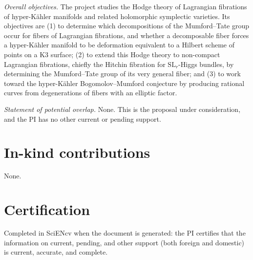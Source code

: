 \documentclass[11pt]{article}
\begin{document}
\emph{Overall objectives.} The project studies the Hodge theory of Lagrangian fibrations of
hyper-K\"ahler manifolds and related holomorphic symplectic varieties. Its objectives are
(1) to determine which decompositions of the Mumford--Tate group occur for fibers of
Lagrangian fibrations, and whether a decomposable fiber forces a hyper-K\"ahler manifold to
be deformation equivalent to a Hilbert scheme of points on a K3 surface; (2) to extend this
Hodge theory to non-compact Lagrangian fibrations, chiefly the Hitchin fibration for
$\mathrm{SL}_r$-Higgs bundles, by determining the Mumford--Tate group of its very general
fiber; and (3) to work toward the hyper-K\"ahler Bogomolov--Mumford conjecture by producing
rational curves from degenerations of fibers with an elliptic factor.

\emph{Statement of potential overlap.} None. This is the proposal under consideration, and
the PI has no other current or pending support.

\section*{In-kind contributions}

None.

\section*{Certification}

Completed in SciENcv when the document is generated: the PI certifies that the information
on current, pending, and other support (both foreign and domestic) is current, accurate, and
complete.
\end{document}
